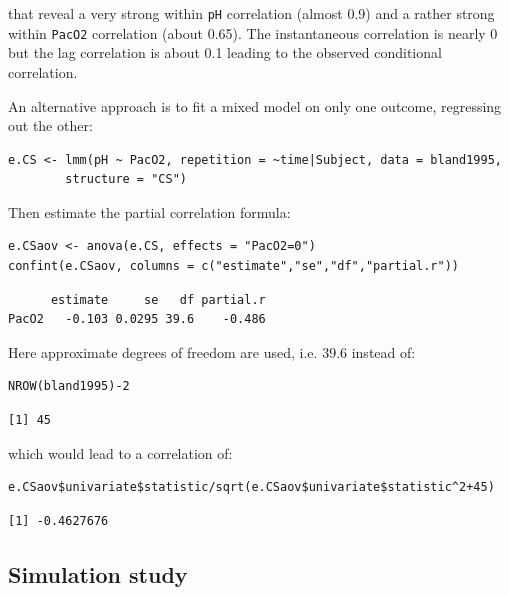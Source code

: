 \documentclass[12pt]{article}
\begin{document}
that reveal a very strong within \texttt{pH} correlation (almost 0.9) and a
rather strong within \texttt{PacO2} correlation (about 0.65). The
instantaneous correlation is nearly 0 but the lag correlation is about
0.1 leading to the observed conditional correlation.

\bigskip

An alternative approach is to fit a mixed model on only one outcome,
regressing out the other:
\lstset{language=r,label= ,caption= ,captionpos=b,numbers=none}
\begin{lstlisting}
e.CS <- lmm(pH ~ PacO2, repetition = ~time|Subject, data = bland1995,
	    structure = "CS")
\end{lstlisting}

Then estimate the partial correlation formula:
\lstset{language=r,label= ,caption= ,captionpos=b,numbers=none}
\begin{lstlisting}
e.CSaov <- anova(e.CS, effects = "PacO2=0")
confint(e.CSaov, columns = c("estimate","se","df","partial.r"))
\end{lstlisting}

\begin{verbatim}
      estimate     se   df partial.r
PacO2   -0.103 0.0295 39.6    -0.486
\end{verbatim}


\clearpage

Here approximate degrees of freedom are used, i.e. 39.6 instead of:
\lstset{language=r,label= ,caption= ,captionpos=b,numbers=none}
\begin{lstlisting}
NROW(bland1995)-2
\end{lstlisting}

\begin{verbatim}
[1] 45
\end{verbatim}


which would lead to a correlation of:
\lstset{language=r,label= ,caption= ,captionpos=b,numbers=none}
\begin{lstlisting}
e.CSaov$univariate$statistic/sqrt(e.CSaov$univariate$statistic^2+45)
\end{lstlisting}

\begin{verbatim}
[1] -0.4627676
\end{verbatim}

\subsection{Simulation study}
\label{sec:org467e557}
\end{document}
